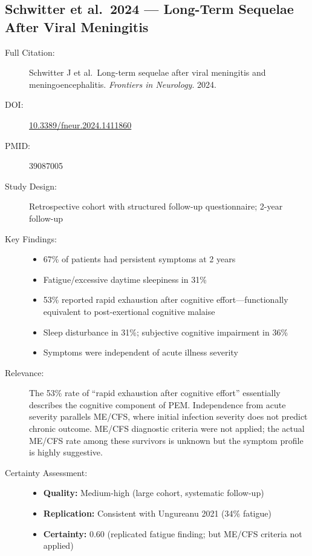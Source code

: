 \subsection{Schwitter et al.\ 2024 --- Long-Term Sequelae After Viral Meningitis}

\begin{description}
    \item[Full Citation:] Schwitter J et al.\ Long-term sequelae after viral meningitis and meningoencephalitis. \textit{Frontiers in Neurology}. 2024.
    \item[DOI:] \href{https://doi.org/10.3389/fneur.2024.1411860}{10.3389/fneur.2024.1411860}
    \item[PMID:] 39087005
    \item[Study Design:] Retrospective cohort with structured follow-up questionnaire; 2-year follow-up
    \item[Key Findings:]
    \begin{itemize}
        \item 67\% of patients had persistent symptoms at 2 years
        \item Fatigue/excessive daytime sleepiness in 31\%
        \item 53\% reported rapid exhaustion after cognitive effort---functionally equivalent to post-exertional cognitive malaise
        \item Sleep disturbance in 31\%; subjective cognitive impairment in 36\%
        \item Symptoms were independent of acute illness severity
    \end{itemize}
    \item[Relevance:] The 53\% rate of ``rapid exhaustion after cognitive effort'' essentially describes the cognitive component of PEM. Independence from acute severity parallels ME/CFS, where initial infection severity does not predict chronic outcome. ME/CFS diagnostic criteria were not applied; the actual ME/CFS rate among these survivors is unknown but the symptom profile is highly suggestive.
    \item[Certainty Assessment:]
    \begin{itemize}
        \item \textbf{Quality:} Medium-high (large cohort, systematic follow-up)
        \item \textbf{Replication:} Consistent with Ungureanu 2021 (34\% fatigue)
        \item \textbf{Certainty:} 0.60 (replicated fatigue finding; but ME/CFS criteria not applied)
    \end{itemize}
\end{description}

